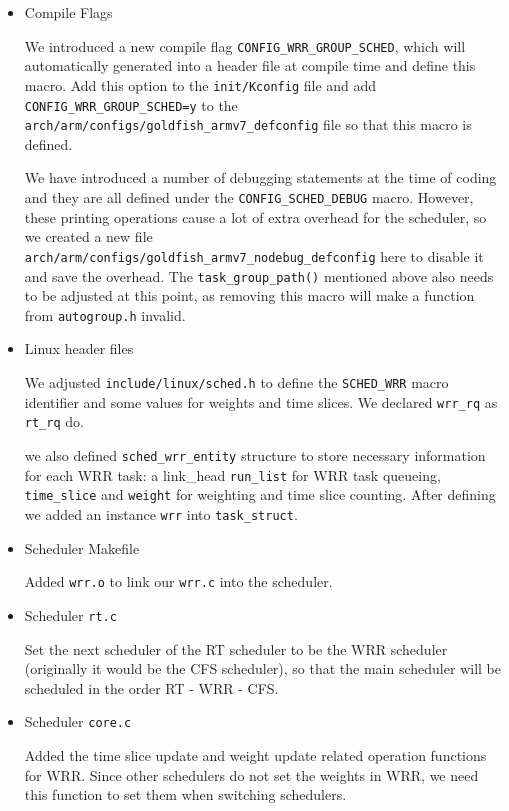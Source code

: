 \documentclass[11pt]{article}
\begin{document}
\begin{itemize}
\item
  Compile Flags

  We introduced a new compile flag \texttt{CONFIG\_WRR\_GROUP\_SCHED},
  which will automatically generated into a header file at compile time
  and define this macro. Add this
  option to the \texttt{init/Kconfig} file and add
  \texttt{CONFIG\_WRR\_GROUP\_SCHED=y} to the
  \texttt{arch/arm/configs/goldfish\_armv7\_defconfig} file so that this
  macro is defined.

  We have introduced a number of debugging statements at the time of
  coding and they are all defined under the
  \texttt{CONFIG\_SCHED\_DEBUG} macro. However, these printing
  operations cause a lot of extra overhead for the scheduler, so we
  created a new file
  \texttt{arch/arm/configs/goldfish\_armv7\_nodebug\_defconfig} here to
  disable it and save the overhead. The \texttt{task\_group\_path()}
  mentioned above also needs to be adjusted at this point, as removing
  this macro will make a function from \texttt{autogroup.h} invalid.
\item
  Linux header files

  We adjusted \texttt{include/linux/sched.h} to define the
  \texttt{SCHED\_WRR} macro identifier and some values for weights and
  time slices. We declared \texttt{wrr\_rq} as \texttt{rt\_rq} do.

  we also defined \texttt{sched\_wrr\_entity} structure to store
  necessary information for each WRR task: a link\_head
  \texttt{run\_list} for WRR task queueing, \texttt{time\_slice} and
  \texttt{weight} for weighting and time slice counting. After defining
  we added an instance \texttt{wrr} into \texttt{task\_struct}.
\item
  Scheduler Makefile

  Added \texttt{wrr.o} to link our \texttt{wrr.c} into the scheduler.
\item
  Scheduler \texttt{rt.c}

  Set the next scheduler of the RT scheduler to be the WRR scheduler
  (originally it would be the CFS scheduler), so that the main scheduler
  will be scheduled in the order RT - WRR - CFS.
\item
  Scheduler \texttt{core.c}

  Added the time slice update and weight update related operation
  functions for WRR. Since other schedulers do not set the weights in
  WRR, we need this function to set them when switching schedulers.


\end{itemize}
\end{document}
